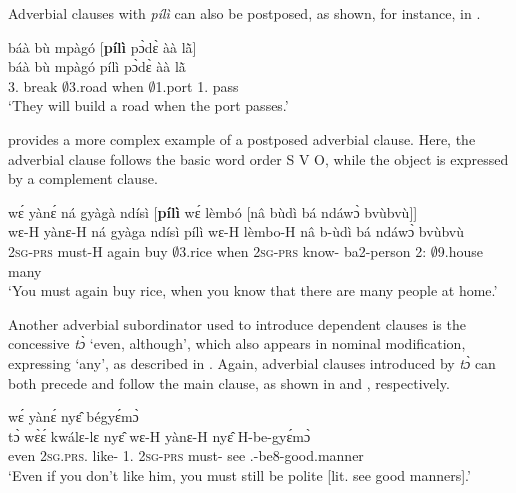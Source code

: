 \noindent Adverbial clauses with {\itshape pílì} can also be postposed, as shown, for instance, in .


\ea\label{pili3} 
  \glll báà bù mpàgó [{\bfseries pílì} pɔ̀dɛ̀ àà lã̀]\textsubscript{{\ADV}} \\
      báà bù mpàgó {\db}pílì pɔ̀dɛ̀ àà lã̀ \\
        3.{\FUT} break $\emptyset$3.road {\db}when $\emptyset$1.port 1.{\FUT} pass \\
    \trans `They will build a road when the port passes.'
\z

 provides a more complex example of a postposed adverbial clause. Here, the adverbial clause follows the basic word order S V O, while the object is expressed by a complement clause.


\ea\label{pili4} 
  \glll  wɛ́ yànɛ́ ná gyàgà ndísì [{\bfseries pílì} wɛ́ lèmbó [nâ bùdì bá ndáwɔ̀ bvùbvù]\textsubscript{{\COMP}}]\textsubscript{{\ADV}} \\
     wɛ-H yànɛ-H ná gyàga ndísì {\db}pílì wɛ-H lèmbo-H nâ b-ùdì bá ndáwɔ̀ bvùbvù \\
        2\textsc{sg}-\textsc{prs} must-H again buy $\emptyset$3.rice {\db}when 2\textsc{sg}-\textsc{prs} know-{\R} {\COMP} ba2-person 2:{\ATT} $\emptyset$9.house many \\
    \trans `You must again buy rice, when you know that there are many people at home.'
\z




Another adverbial subordinator used to introduce dependent clauses is the concessive {\itshape tɔ̀} `even, although', which also appears in nominal modification, expressing `any', as described in . Again, adverbial clauses introduced by {\itshape tɔ̀} can both precede and follow the main clause, as shown in  and , respectively.


\ea\label{Conc1}
  \textsubscript{{\ADV}} wɛ́ yànɛ́ nyɛ̂ bégyɛ́mɔ̀ \\
         {\db}tɔ̀ wɛ̀ɛ́ kwálɛ-lɛ nyɛ̂ wɛ-H yànɛ-H nyɛ̂ H-be-gyɛ́mɔ̀ \\
        {\db}even 2\textsc{sg}.\textsc{prs}.{\NEG} like-{\NEG} 1.{\OBJ} 2\textsc{sg}-\textsc{prs} must-{\R} see {\OBJ}.{\LINK}-be8-good.manner \\
    \trans `Even if you don't like him, you must still be polite [lit. see good manners].'
\z



